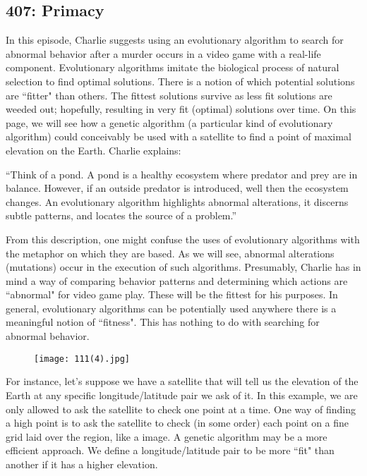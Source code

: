 \newpage
\subsection{407: Primacy}\label{407}

In this episode, Charlie suggests using an evolutionary algorithm to search for abnormal behavior after a murder occurs in a video game with a real-life component. Evolutionary algorithms imitate the biological process of natural selection to find optimal solutions. There is a notion of which potential solutions are ``fitter" than others. The fittest solutions survive as less fit solutions are weeded out; hopefully, resulting in very fit (optimal) solutions over time. On this page, we will see how a genetic algorithm (a particular kind of evolutionary algorithm) could conceivably be used with a satellite to find a point of maximal elevation on the Earth. Charlie explains: \\

\begin{center} ``Think of a pond. A pond is a healthy ecosystem where predator and prey are in balance. However, if an outside predator is introduced, well then the ecosystem changes. An evolutionary algorithm highlights abnormal alterations, it discerns subtle patterns, and locates the source of a problem.'' \end{center}

From this description, one might confuse the uses of evolutionary algorithms with the metaphor on which they are based. As we will see, abnormal alterations (mutations) occur in the execution of such algorithms. Presumably, Charlie has in mind a way of comparing behavior patterns and determining which actions are ``abnormal" for video game play. These will be the fittest for his purposes. In general, evolutionary algorithms can be potentially used anywhere there is a meaningful notion of ``fitness". This has nothing to do with searching for abnormal behavior. \\

\begin{figure}[H]
   \centering
   \texttt{[image: 111(4).jpg]} 
\end{figure}

For instance, let's suppose we have a satellite that will tell us the elevation of the Earth at any specific longitude/latitude pair we ask of it. In this example, we are only allowed to ask the satellite to check one point at a time. One way of finding a high point is to ask the satellite to check (in some order) each point on a fine grid laid over the region, like a  image. A genetic algorithm may be a more efficient approach. We define a longitude/latitude pair to be more ``fit" than another if it has a higher elevation. \\

